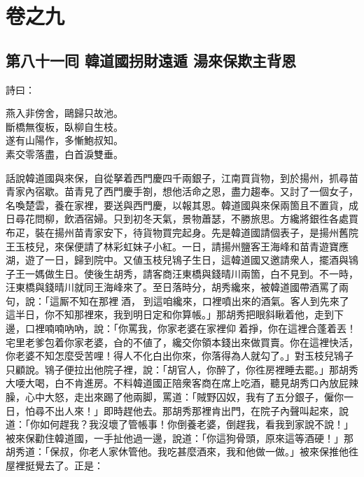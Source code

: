 \part*{{\titlename}卷之九}



\chapter*{第八十一囘 韓道國拐財遠遁 湯來保欺主背恩}


詩曰：

\begin{myquote}
燕入非傍舍，鷗歸只故池。\\斷橋無復板，臥柳自生枝。\\遂有山陽作，多慚鮑叔知。\\素交零落盡，白首淚雙垂。
\end{myquote}

話說韓道國與來保，自從拏着西門慶四千兩銀子，江南買貨物，到於揚州，抓尋苗青家內宿歇。苗青見了西門慶手劄，想他活命之恩，盡力趨奉。又討了一個女子，名喚楚雲，養在家裡，要送與西門慶，以報其恩。韓道國與來保兩箇且不置貨，成日尋花問柳，飲酒宿婦。{}只到初冬天氣，景物蕭瑟，不勝旅思。方纔將銀徃各處買布疋，裝在揚州苗青家安下，待貨物買完起身。先是韓道國請個表子，是揚州舊院王玉枝兒，來保便請了林彩虹妹子小紅。一日，請揚州鹽客王海峰和苗青遊寶應湖，遊了一日，歸到院中。又値玉枝兒鴇子生日，{}這韓道國又邀請衆人，擺酒與鴇子王一媽做生日。使後生胡秀，請客商汪東橋與錢晴川兩箇，白不見到。不一時，汪東橋與錢晴川就同王海峰來了。至日落時分，胡秀纔來，被韓道國帶酒罵了兩句，說：「這厮不知在那裡𠳹酒，𠳹到這咱纔來，口裡噴出來的酒氣。客人到先來了這半日，你不知那裡來，我到明日定和你算帳。」那胡秀把眼斜瞅着他，走到下邊，口裡喃喃吶吶，說：「你罵我，你家老婆在家裡仰𢵞着掙，你在這裡合蓬着丟！宅里老爹包着你家老婆，㒲的不値了，纔交你領本錢出來做買賣。你在這裡快活，你老婆不知怎麼受苦哩！得人不化白出你來，你落得為人就勾了。」{}對玉枝兒鴇子只顧說。鴇子便拉出他院子裡，說：「胡官人，你醉了，你徃房裡睡去罷。」那胡秀大喓大喝，白不肯進房。不料韓道國正陪衆客商在席上吃酒，聽見胡秀口內放屁辣臊，心中大怒，走出來踢了他兩脚，罵道：「賊野囚奴，我有了五分銀子，僱你一日，怕尋不出人來！」{}即時趕他去。那胡秀那裡肯出門，在院子內聲叫起來，說道：「你如何趕我？我沒壞了管帳事！你倒養老婆，倒趕我，看我到家說不說！」{}被來保勸住韓道國，一手扯他過一邊，說道：「你這狗骨頭，原來這等酒硬！」那胡秀道：「保叔，你老人家休管他。我吃甚麼酒來，我和他做一做。」被來保推他徃屋裡挺覺去了。正是：

